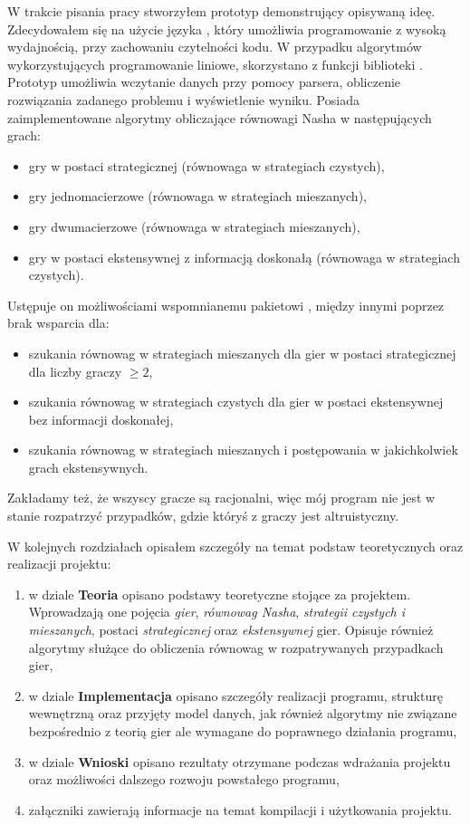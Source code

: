 \documentclass[polish]{standalone}
\begin{document}
W trakcie pisania pracy stworzyłem prototyp demonstrujący opisywaną ideę. Zdecydowałem się na użycie języka ,
który umożliwia programowanie z wysoką wydajnością, przy zachowaniu czytelności kodu. W przypadku algorytmów
wykorzystujących programowanie liniowe, skorzystano z funkcji biblioteki . Prototyp umożliwia wczytanie
danych przy pomocy parsera, obliczenie rozwiązania zadanego problemu i wyświetlenie wyniku. Posiada zaimplementowane
algorytmy obliczające równowagi Nasha w następujących grach:
\begin{itemize}
\item gry w postaci strategicznej (równowaga w strategiach czystych),
\item gry jednomacierzowe (równowaga w strategiach mieszanych),
\item gry dwumacierzowe (równowaga w strategiach mieszanych),
\item gry w postaci ekstensywnej z informacją doskonałą (równowaga w strategiach czystych).
\end{itemize}
Ustępuje on możliwościami wspomnianemu pakietowi , między innymi poprzez brak wsparcia dla:
\begin{itemize}
\item szukania równowag w strategiach mieszanych dla gier w postaci strategicznej dla liczby graczy $\geq 2$,
\item szukania równowag w strategiach czystych dla gier w postaci ekstensywnej bez informacji doskonałej,
\item szukania równowag w strategiach mieszanych i postępowania w jakichkolwiek grach ekstensywnych.
\end{itemize}
Zakładamy też, że wszyscy gracze są racjonalni, więc mój program nie jest w stanie rozpatrzyć przypadków, gdzie któryś
z graczy jest altruistyczny.

W kolejnych rozdziałach opisałem szczegóły na temat podstaw teoretycznych oraz realizacji projektu:
\begin{enumerate}
\item w dziale \textbf{Teoria} opisano podstawy teoretyczne stojące za projektem. Wprowadzają one pojęcia \textit{gier},
\textit{równowag Nasha}, \textit{strategii czystych i mieszanych}, postaci \textit{strategicznej}
oraz \textit{ekstensywnej} gier. Opisuje również algorytmy służące do obliczenia równowag w rozpatrywanych przypadkach
gier,
\item w dziale \textbf{Implementacja} opisano szczegóły realizacji programu, strukturę wewnętrzną oraz przyjęty model
danych, jak również algorytmy nie związane bezpośrednio z teorią gier ale wymagane do poprawnego działania programu,
\item w dziale \textbf{Wnioski} opisano rezultaty otrzymane podczas wdrażania projektu oraz możliwości dalszego
rozwoju powstałego programu,
\item załączniki zawierają informacje na temat kompilacji i użytkowania projektu.
\end{enumerate}
\end{document}
